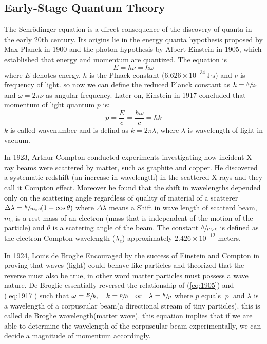 \documentclass[11pt]{article}
\begin{document}
\subsection{Early-Stage Quantum Theory}
The Schrödinger equation is a direct consequence of the discovery of quanta in the early 20th century. Its origins lie in the energy quanta hypothesis proposed by Max Planck in 1900 and the photon hypothesis by Albert Einstein in 1905, which established that energy and momentum are quantized. The equation is 
\begin{equation}  \label{eq:1905}
	E = h \nu = \hbar \omega
\end{equation} 
where $E$ denotes energy, $h$ is the Plnack constant ($6.626 \times 10^{-34} \,\text{J·s}$) and $\nu$ is frequency of light. so now we can define the reduced Planck constant as $\hbar = \sfrac{h}{2 \pi}$ and $\omega = 2 \pi \nu$ as angular frequency. 
Later on, Einstein in 1917 concluded that momentum of light quantum $p$ is:
\begin{equation}  \label{eq:1917}
	 p = \frac{E}{c} = \frac{\hbar \omega}{c} = \hbar k 
\end{equation}
$k$ is called wavenumber and is defind as $ k = 2 \pi \lambda$, where $\lambda$ is wavelength of light in vacuum.

In 1923, Arthur Compton conducted experiments investigating how incident X-ray beams were scattered by matter, such as graphite and copper. He discovered a systematic redshift (an increase in wavelength) in the scattered X-rays and they call it Compton effect. Moreover he found that the shift in wavelengths depended only on the scattering angle regardless of quality of material of a scatterer $\Delta \lambda = \sfrac{h}{m_e c} (1 - \cos \theta)$ where $\Delta \lambda$ means a Shift in wave length of scatterd beam, $m_e$ is a rest mass of an electron (mass that is independent of the motion of the particle) and $\theta$ is a scatering angle of the beam. The constant $\sfrac{h}{m_e c} $ is defined as the electron Compton wavelength ($\lambda_e$) approximately $ 2.426 \times 10^{-12} $ meters.

In 1924, Louis de Broglie Encouraged by the success of Einstein and Compton in proving that waves (light) could behave like particles and theorized that the reverse must also be true, in other word matter particles must possess a wave nature. De Broglie essentially reversed the relationship of (\ref{eq:1905}) and (\ref{eq:1917}) such that $\omega = \sfrac{E}{\hbar}, \quad k = \sfrac{p}{\hbar} \quad \text{or} \quad \lambda = \sfrac{h}{p}$ where $p$ equals $|p|$ and $\lambda$ is a wavelength of a corpuscular beam(a directional stream of tiny particles). this is called de Broglie wavelength(matter wave). this equation implies that if we are able to determine the wavelength of the corpuscular beam experimentally, we can decide a magnitude of momentum accordingly.
\end{document}
